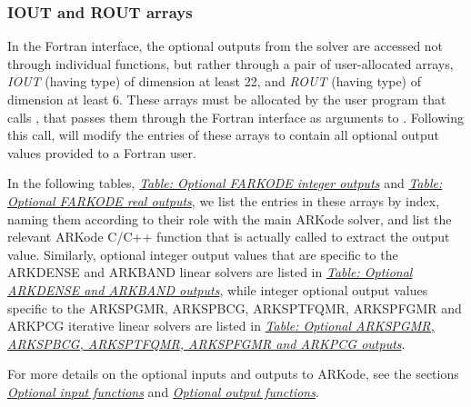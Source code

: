 \documentclass[letterpaper,10pt,english]{sphinxmanual}
\begin{document}
\subsubsection{IOUT and ROUT arrays}
\label{f_interface/Optional_output:iout-and-rout-arrays}
In the Fortran interface, the optional outputs from the
{\hyperref[f_interface/Usage:f/_/FARKODE]{}} solver are accessed not through individual
functions, but rather through a pair of user-allocated arrays, \emph{IOUT}
(having  type) of dimension at least 22, and \emph{ROUT}
(having  type) of dimension at least 6.  These arrays must
be allocated by the user program that calls {\hyperref[f_interface/Usage:f/_/FARKODE]{}}, that
passes them through the Fortran interface as arguments to
{\hyperref[f_interface/Usage:f/_/FARKMALLOC]{}}.  Following this call, {\hyperref[f_interface/Usage:f/_/FARKODE]{}} will
modify the entries of these arrays to contain all optional output
values provided to a Fortran user.

In the following tables, {\hyperref[f_interface/Optional_output:finterface-iouttable]{\emph{Table: Optional FARKODE integer outputs}}} and
{\hyperref[f_interface/Optional_output:finterface-routtable]{\emph{Table: Optional FARKODE real outputs}}}, we list the entries in these
arrays by index, naming them according to their role with the main
ARKode solver, and list the relevant ARKode C/C++ function that is
actually called to extract the output value.  Similarly, optional
integer output values that are specific to the ARKDENSE and ARKBAND
linear solvers are listed in {\hyperref[f_interface/Optional_output:finterface-dlsiouttable]{\emph{Table: Optional ARKDENSE and ARKBAND outputs}}},  while
integer optional output values specific to the ARKSPGMR,
ARKSPBCG, ARKSPTFQMR, ARKSPFGMR and ARKPCG iterative linear solvers
are listed in {\hyperref[f_interface/Optional_output:finterface-spilsiouttable]{\emph{Table: Optional ARKSPGMR, ARKSPBCG, ARKSPTFQMR, ARKSPFGMR and ARKPCG outputs}}}.

For more details on the optional inputs and outputs to ARKode, see
the sections {\hyperref[c_interface/User_callable:cinterface-optionalinputs]{\emph{Optional input functions}}} and
{\hyperref[c_interface/User_callable:cinterface-optionaloutputs]{\emph{Optional output functions}}}.
\end{document}
